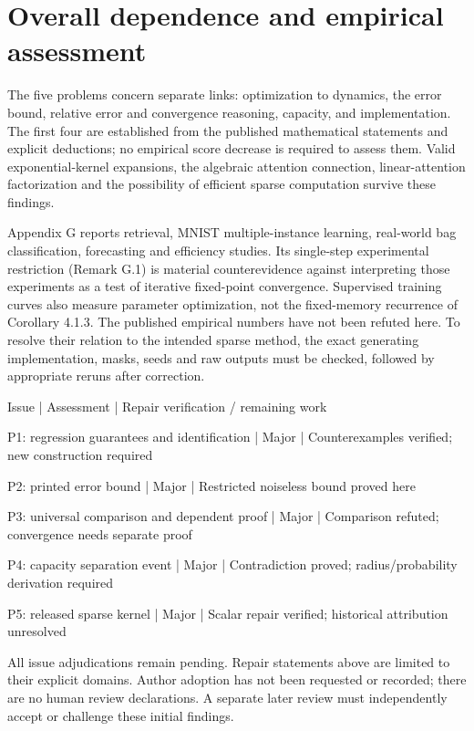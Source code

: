 \documentclass[10pt]{article}
\begin{document}
\section*{Overall dependence and empirical assessment}
The five problems concern separate links: optimization to dynamics, the error bound, relative error and convergence reasoning, capacity, and implementation. The first four are established from the published mathematical statements and explicit deductions; no empirical score decrease is required to assess them. Valid exponential-kernel expansions, the algebraic attention connection, linear-attention factorization and the possibility of efficient sparse computation survive these findings.\par
Appendix G reports retrieval, MNIST multiple-instance learning, real-world bag classification, forecasting and efficiency studies. Its single-step experimental restriction (Remark G.1) is material counterevidence against interpreting those experiments as a test of iterative fixed-point convergence. Supervised training curves also measure parameter optimization, not the fixed-memory recurrence of Corollary 4.1.3. The published empirical numbers have not been refuted here. To resolve their relation to the intended sparse method, the exact generating implementation, masks, seeds and raw outputs must be checked, followed by appropriate reruns after correction.\par
Issue | Assessment | Repair verification / remaining work\par
P1: regression guarantees and identification | Major | Counterexamples verified; new construction required\par
P2: printed error bound | Major | Restricted noiseless bound proved here\par
P3: universal comparison and dependent proof | Major | Comparison refuted; convergence needs separate proof\par
P4: capacity separation event | Major | Contradiction proved; radius/probability derivation required\par
P5: released sparse kernel | Major | Scalar repair verified; historical attribution unresolved\par
All issue adjudications remain pending. Repair statements above are limited to their explicit domains. Author adoption has not been requested or recorded; there are no human review declarations. A separate later review must independently accept or challenge these initial findings.\par
\end{document}
